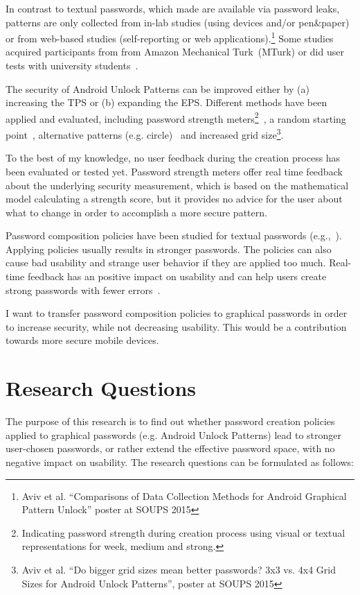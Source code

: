 \documentclass[twocolumn, a4paper, 10pt]{article}
\begin{document}
In contrast to textual passwords, which made are available via password leaks, patterns are only collected from in-lab studies (using devices and/or pen\&paper) or from web-based studies (self-reporting or web applications).\footnote{Aviv et al. ``Comparisons of Data Collection Methods for Android Graphical Pattern Unlock'' poster at SOUPS 2015} Some studies~\cite{siadati2015fortifying, Aviv:2014:UVP:2664243.2664253} acquired participants from from Amazon Mechanical Turk~(MTurk) or did user tests with university students~\cite{Uellenbeck:2013:QSG:2508859.2516700, Sun2014308}.

The security of Android Unlock Patterns can be improved either by (a) increasing the TPS or (b) expanding the EPS. Different methods have been applied and evaluated, including password strength meters\footnote{Indicating password strength during creation process using visual or textual representations for week, medium and strong.}~\cite{Sun2014308, siadati2015fortifying}, a random starting point~\cite{siadati2015fortifying}, alternative patterns (e.g. circle)~\cite{Uellenbeck:2013:QSG:2508859.2516700} and increased grid size\footnote{Aviv et al. ``Do bigger grid sizes mean better passwords? 3x3 vs. 4x4 Grid Sizes for Android Unlock Patterns'', poster at SOUPS 2015}.

To the best of my knowledge, no user feedback during the creation process has been evaluated or tested yet. Password strength meters offer real time feedback about the underlying security measurement, which is based on the mathematical model calculating a strength score, but it provides no advice for the user about what to change in order to accomplish a more secure pattern.

Password composition policies have been studied for textual passwords (e.g.,~\cite{Inglesant:2010:TCU:1753326.1753384, Komanduri:2011:PPM:1978942.1979321}). Applying policies usually results in stronger passwords. The policies can also cause bad usability and strange user behavior if they are applied too much. Real-time feedback has an positive impact on usability and can help users create strong passwords with fewer errors~\cite{Shay:2015:SSI:2702123.2702586}.

I want to transfer password composition policies to graphical passwords in order to increase security, while not decreasing usability. This would be a contribution towards more secure mobile devices.


\section{Research Questions}
\label{sec:question}
The purpose of this research is to find out whether password creation policies applied to graphical passwords (e.g. Android Unlock Patterns) lead to stronger user-chosen passwords, or rather extend the effective password space, with no negative impact on usability. The research questions can be formulated as follows:
\end{document}
